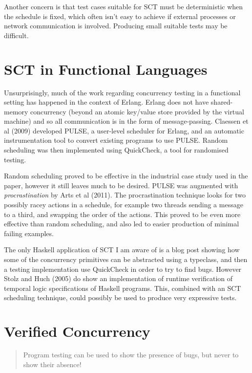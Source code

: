 Another concern is that test cases suitable for SCT must be
deterministic when the schedule is fixed, which often isn't easy to
achieve if external processes or network communication is
involved. Producing small suitable tests may be difficult.

\section{SCT in Functional Languages}
\label{sec:litrev-sctfunc}

Unsurprisingly, much of the work regarding concurrency testing in a
functional setting has happened in the context of Erlang. Erlang does
not have shared-memory concurrency (beyond an atomic key/value store
provided by the virtual machine) and so all communication is in the
form of message-passing. Claessen et al (2009)\nocite{pulse} developed
PULSE, a user-level scheduler for Erlang, and an automatic
instrumentation tool to convert existing programs to use PULSE. Random
scheduling was then implemented using QuickCheck, a tool for
randomised testing.

Random scheduling proved to be effective in the industrial case study
used in the paper, however it still leaves much to be desired. PULSE
was augmented with \textit{procrastination} by Arts et al (2011). The
procrastination technique looks for two possibly racey actions in a
schedule, for example two threads sending a message to a third, and
swapping the order of the actions. This proved to be even more
effective than random scheduling, and also led to easier production of
minimal failing examples.

The only Haskell application of SCT I am aware of is a blog
post\cite{typeclass} showing how some of the concurrency primitives
can be abstracted using a typeclass, and then a testing implementation
use QuickCheck in order to try to find bugs. However Stolz and Huch
(2005)\nocite{rvhaskell} do show an implementation of runtime
verification of temporal logic specifications of Haskell
programs. This, combined with an SCT scheduling technique, could
possibly be used to produce very expressive tests.

\section{Verified Concurrency}
\label{sec:litref-verify}

\begin{quote}
  Program testing can be used to show the presence of bugs, but never
  to show their absence!

\end{quote}

